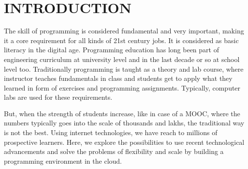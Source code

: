 \documentclass[DD]{iitmdiss}
\begin{document}
\pagebreak


%
%




\chapter{INTRODUCTION}
\label{chap:intro}
The skill of programming is considered fundamental and very important, making it a core requirement for all kinds of 21st century jobs. It is considered as basic literacy in the digital age. Programming education has long been part of engineering curriculum at university level and in the last decade or so at school level too. Traditionally programming is taught as a theory and lab course, where instructor teaches fundamentals in class and students get to apply what they learned in form of exercises and programming assignments. Typically, computer labs are used for these requirements.  

But, when the strength of students increase, like in case of a MOOC, where the numbers typically goes into the scale of thousands and lakhs, the traditional way is not the best. Using internet technologies, we have reach to millions of prospective learners. Here, we explore the possibilities to use recent technological advancements and solve the problems of flexibility and scale by building a programming environment in the cloud.
\end{document}
